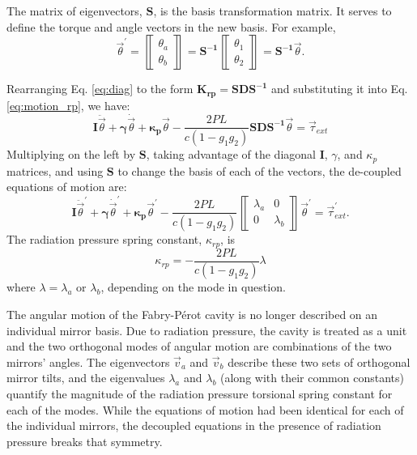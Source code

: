 The matrix of eigenvectors, $\mathbf{S}$, is the basis transformation
matrix. It serves to define the torque and angle vectors in the new
basis. For example,
\begin{equation}
\vec{\theta}^\prime = \left\llbracket \begin{array}{c}
\theta_a\\
\theta_b \end{array} \right\rrbracket = \mathbf{S^{-1}}
\left\llbracket \begin{array}{c}
\theta_1\\
\theta_2 \end{array} \right\rrbracket
= \mathbf{S^{-1}} \vec{\theta}.
\end{equation}

Rearranging Eq. \ref{eq:diag} to the form $\mathbf{K_{rp}} =
\mathbf{S D S^{-1}}$ and substituting it into Eq. \ref{eq:motion_rp},
we have:
\begin{equation}
\mathbf{I} \ddot{\vec{\theta}} 
+ {\bm \gamma} \dot{\vec{\theta}} 
+ \mathbf{\kappa_p} \vec{\theta}
- \frac{2 P L}{c (1-g_1 g_2)} \mathbf{S D S^{-1}} \vec{\theta} 
= \vec{\tau}_{ext} 
\end{equation}
Multiplying on the left by $\mathbf{S}$, taking advantage of the
diagonal $\mathbf{I}$, $\gamma$, and $\kappa_p$ matrices, and using
$\mathbf{S}$ to change the basis of each of the vectors, the
de-coupled equations of motion are:
\begin{equation}
\mathbf{I} \ddot{\vec{\theta}}^\prime 
+ {\bm \gamma} \dot{\vec{\theta}}^\prime 
+ \mathbf{\kappa_p} \vec{\theta}^\prime
- \frac{2 P L}{c (1-g_1 g_2)}
\left\llbracket \begin{array}{cc}
\lambda_a & 0\\
0 & \lambda_b \end{array} \right\rrbracket \vec{\theta}^\prime 
= \vec{\tau}_{ext}^\prime.
\label{eq:rp_eqmotion}
\end{equation}
The radiation pressure spring constant, $\kappa_{rp}$, is 
\begin{equation}
\kappa_{rp} = - \frac{2 P L}{c (1-g_1 g_2)} \lambda
\end{equation}
where $\lambda = \lambda_a$ or $\lambda_b$, depending on the mode in
question. 

The angular motion of the Fabry-P\'{e}rot cavity is no longer
described on an individual mirror basis. Due to radiation pressure,
the cavity is treated as a unit and the two orthogonal modes of
angular motion are combinations of the two mirrors' angles. The
eigenvectors $\vec{v}_a$ and $\vec{v}_b$ describe these two sets of
orthogonal mirror tilts, and the eigenvalues $\lambda_a$ and
$\lambda_b$ (along with their common constants) quantify the magnitude
of the radiation pressure torsional spring constant for each of the
modes. While the equations of motion had been identical for each of
the individual mirrors, the decoupled equations in the presence of
radiation pressure breaks that symmetry.


